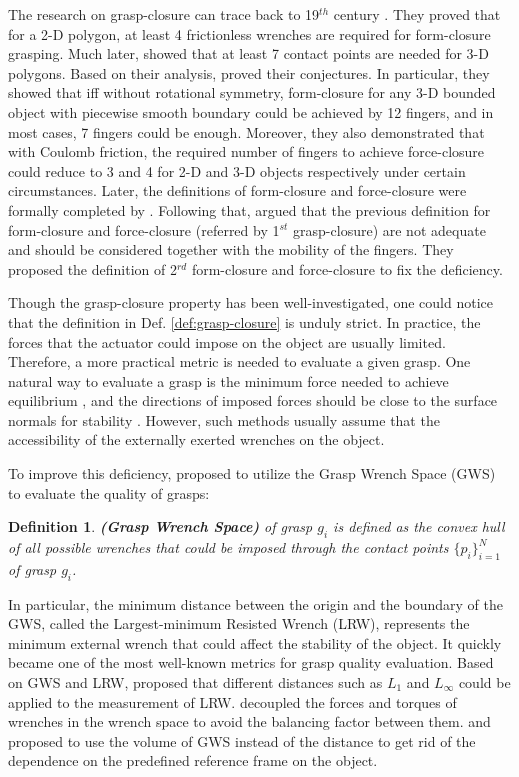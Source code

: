 \documentclass[letterpaper,10pt]{article}
\newcommand{\defref}[1]{Def. \ref{#1}}
\newcommand{\g}[1]{g_{#1}}
\newcommand{\p}[1]{p_{#1}}
\newcommand{\pnum}{N}
\newtheorem{definition}{Definition}
\begin{document}
The research on grasp-closure can trace back to 19$^{th}$ century \cite{reuleax1963kinematics}. They proved that for a 2-D polygon, at least 4 frictionless wrenches are required for form-closure grasping. 
Much later, \cite{lakshiminarayana1978mechanics} showed that at least 7 contact points are needed for 3-D polygons.
Based on their analysis, \cite{markenscoff1990geometry} proved their conjectures.
In particular, they showed that iff without rotational symmetry, form-closure for any 3-D bounded object with piecewise smooth boundary could be achieved by 12 fingers, and in most cases, 7 fingers could be enough.
Moreover, they also demonstrated that with Coulomb friction, the required number of fingers to achieve force-closure could reduce to 3 and 4 for 2-D and 3-D objects respectively under certain circumstances.
Later, the definitions of form-closure and force-closure were formally completed by \cite{bicchi1995closure}.
Following that, \cite{rimon1996force} argued that the previous definition for form-closure and force-closure (referred by 1$^{st}$ grasp-closure) are not adequate and should be considered together with the mobility of the fingers. 
They proposed the definition of 2$^{rd}$ form-closure and force-closure to fix the deficiency.

Though the grasp-closure property has been well-investigated, one could notice that the definition in \defref{def:grasp-closure} is unduly strict.
In practice, the forces that the actuator could impose on the object are usually limited.
Therefore, a more practical metric is needed to evaluate a given grasp.
One natural way to evaluate a grasp is the minimum force needed to achieve equilibrium \cite{markenscoff1989optimum, pollard2004closure, liu2004quality}, and the directions of imposed forces should be close to the surface normals for stability \cite{han2000grasp, liu2004quality}.
However, such methods usually assume that the accessibility of the externally exerted wrenches on the object.

To improve this deficiency, \cite{ferrari1992planning} proposed to utilize the Grasp Wrench Space (GWS) to evaluate the quality of grasps:
\begin{definition}
\label{def:gws}
	{\bf (Grasp Wrench Space)} of grasp $\g{i}$ is defined as the convex hull of all possible wrenches that could be imposed through the contact points $\{\p{i}\}_{i=1}^{\pnum}$ of grasp $\g{i}$.
\end{definition}
In particular, the minimum distance between the origin and the boundary of the GWS, called the Largest-minimum Resisted Wrench (LRW), represents the minimum external wrench that could affect the stability of the object.
It quickly became one of the most well-known metrics for grasp quality evaluation.
Based on GWS and LRW, \cite{mishra1995grasp} proposed that different distances such as $L_1$ and $L_\infty$ could be applied to the measurement of LRW.
\cite{mirtich1994easily} decoupled the forces and torques of wrenches in the wrench space to avoid the balancing factor between them.
\cite{teichmann1996grasp} and \cite{miller1999examples} proposed to use the volume of GWS instead of the distance to get rid of the dependence on the predefined reference frame on the object.
\end{document}
